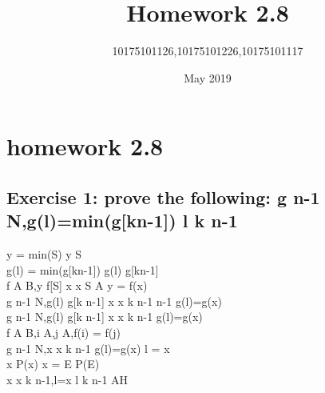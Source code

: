 \documentclass[11pt,a4paper,fleqn]{article}
\title{Homework 2.8}
\author{10175101126,10175101226,10175101117}
\date{May 2019}
\begin{document}
\maketitle


\section{homework 2.8}

\subsection{Exercise 1: prove the following:  g  \upto n-1 \rightarrow N,g(l)=min(g[k\upto n-1]) \vdash l \in k \upto n-1} 
\noindent
y = min(S) \vdash y \in S \\
g(l) = min(g[k\upto n-1]) \vdash g(l) \in g[k\upto n-1] \\
f \in A \rightarrow B,y \in f[S] \vdash \exists x \cdot x \in S \cap A \wedge y = f(x) \\
g  \upto n-1 \rightarrow N,g(l) \in g[k \upto n-1] \vdash \exists x \cdot x \in k \upto n-1  \upto n-1 \wedge g(l)=g(x) \\
g  \upto n-1 \rightarrow N,g(l) \in g[k \upto n-1] \vdash \exists x \cdot x \in k \upto n-1 \wedge g(l)=g(x) \\
f \in A \rightarrowtail B,i \in A,j \in A,f(i) = f(j) \\
g  \upto n-1 \rightarrowtail N,\exists x \cdot x \in k \upto n-1 \wedge g(l)=g(x) \vdash l = x \\
\exists x \cdot P(x) \wedge x = E \vdash P(E) \\
\exists x \cdot x \in k \upto n-1,l=x \vdash l \in k \upto n-1 \; AH \\
\end{document}

